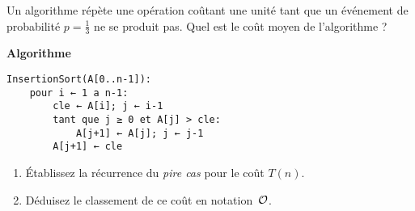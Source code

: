 \begin{exercice}
Un algorithme répète une opération coûtant une unité tant que
un événement de probabilité \(p=\tfrac13\) ne se produit pas.
Quel est le coût moyen de l’algorithme ?
\end{exercice}


\begin{exercice}
\textbf{Algorithme}
\begin{lstlisting}
InsertionSort(A[0..n-1]):
    pour i ← 1 a n-1:
        cle ← A[i]; j ← i-1
        tant que j ≥ 0 et A[j] > cle:
            A[j+1] ← A[j]; j ← j-1
        A[j+1] ← cle
\end{lstlisting}

\begin{enumerate}[label=\alph*)]
  \item Établissez la récurrence du \emph{pire cas} pour le coût $T(n)$.
  \item Déduisez le classement de ce coût en notation~$\mathcal{O}$.
\end{enumerate}
\end{exercice}


